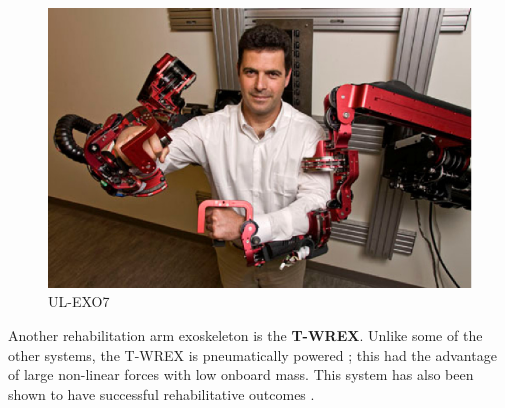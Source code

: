 \begin{figure}
    \centering
    \includegraphics[scale=0.5]{images/background/ULEXO7.png}
    \caption[UL-EXO7]{UL-EXO7 \cite{byl2013chronic}}
    \label{fig:ULEXO7}
\end{figure}


Another rehabilitation arm exoskeleton is the \textbf{T-WREX}. Unlike some of the other systems, the T-WREX is pneumatically powered \cite{TWREX}; this had the advantage of large non-linear forces with low onboard mass. This system has also been shown to have successful rehabilitative outcomes \cite{housman2007arm}.
